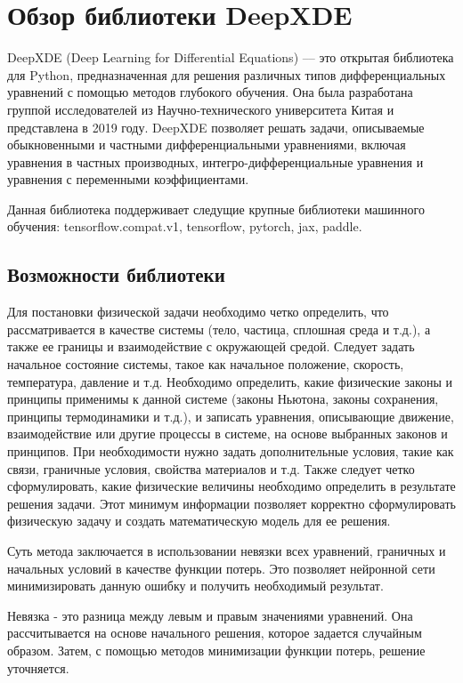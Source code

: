 \chapter{Обзор библиотеки DeepXDE \cite{lu2021deepxde}}

DeepXDE (Deep Learning for Differential Equations) –-- это открытая библиотека для Python,
предназначенная для решения различных типов дифференциальных уравнений с помощью методов
глубокого обучения. Она была разработана группой исследователей из Научно-технического
университета Китая и представлена в 2019 году. DeepXDE позволяет решать задачи, описываемые
обыкновенными и частными дифференциальными уравнениями, включая уравнения в частных производных,
интегро-дифференциальные уравнения и уравнения с переменными коэффициентами.

Данная библиотека поддерживает следущие крупные библиотеки машинного обучения: tensorflow.compat.v1,
tensorflow, pytorch, jax, paddle.

\section{Возможности библиотеки}
Для постановки физической задачи необходимо четко определить, что рассматривается в качестве системы
(тело, частица, сплошная среда и т.д.), а также ее границы и взаимодействие с окружающей средой.
Следует задать начальное состояние системы, такое как начальное положение, скорость, температура,
давление и т.д. Необходимо определить, какие физические законы и принципы применимы к данной системе
(законы Ньютона, законы сохранения, принципы термодинамики и т.д.), и записать уравнения, описывающие
движение, взаимодействие или другие процессы в системе, на основе выбранных законов и принципов. При
необходимости нужно задать дополнительные условия, такие как связи, граничные условия, свойства
материалов и т.д. Также следует четко сформулировать, какие физические величины необходимо определить
в результате решения задачи. Этот минимум информации позволяет корректно сформулировать физическую
задачу и создать математическую модель для ее решения.

Суть метода заключается в использовании невязки всех уравнений, граничных и начальных условий в качестве
функции потерь. Это позволяет нейронной сети минимизировать данную ошибку и получить необходимый результат.

Невязка - это разница между левым и правым значениями уравнений. Она рассчитывается на основе начального решения,
которое задается случайным образом. Затем, с помощью методов минимизации функции потерь, решение уточняется.


